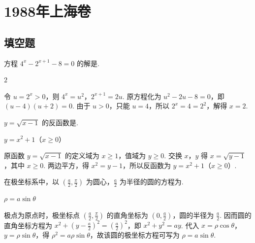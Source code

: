 \chapter{1988年上海卷}

\section{填空题}

\begin{problem}
方程 \(4^x-2^{x+1}-8=0\) 的解是\fillinblank{}.
\end{problem}

\begin{answer}
\(2\)
\end{answer}

\begin{solution}
令 \(u=2^x>0\)，则 \(4^x=u^2\)，\(2^{x+1}=2u\). 原方程化为 \(u^2-2u-8=0\)，即 \((u-4)(u+2)=0\). 由于 \(u>0\)，只能 \(u=4\)，所以 \(2^x=4=2^2\)，解得 \(x=2\).
\end{solution}

\begin{problem}
\(y=\sqrt{x-1}\) 的反函数是\fillinblank{}.
\end{problem}

\begin{answer}
\(y=x^2+1\)（\(x\geqslant0\)）
\end{answer}

\begin{solution}
原函数 \(y=\sqrt{x-1}\) 的定义域为 \(x\geqslant1\)，值域为 \(y\geqslant0\). 交换 \(x\)，\(y\) 得 \(x=\sqrt{y-1}\)，其中 \(x\geqslant0\). 两边平方，得 \(x^2=y-1\)，所以反函数为 \(y=x^2+1\)（\(x\geqslant0\)）.
\end{solution}

\begin{problem}
在极坐标系中，以 \(\left( \frac{a}{2},\frac{\pi}{2} \right)\) 为圆心，\(\frac{a}{2}\) 为半径的圆的方程为\fillinblank{}.
\end{problem}

\begin{answer}
\(\rho=a\sin\theta\)
\end{answer}

\begin{solution}
极点为原点时，极坐标点 \(\left(\frac a2,\frac\pi2\right)\) 的直角坐标为 \(\left(0,\frac a2\right)\)，圆的半径为 \(\frac a2\). 因而圆的直角坐标方程为 \(x^2+\left(y-\frac a2\right)^2=\left(\frac a2\right)^2\)，即 \(x^2+y^2=ay\). 代入 \(x=\rho\cos\theta\)，\(y=\rho\sin\theta\)，得 \(\rho^2=a\rho\sin\theta\)，故该圆的极坐标方程可写为 \(\rho=a\sin\theta\).
\end{solution}

